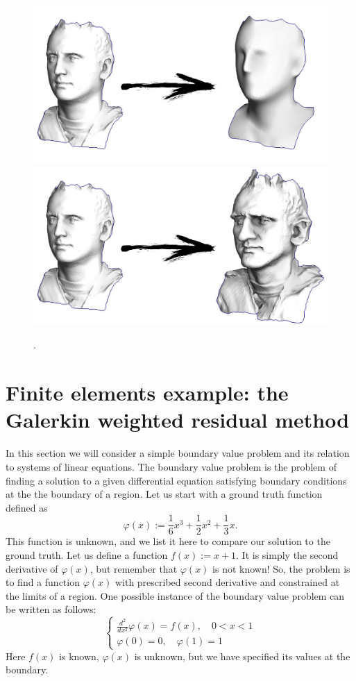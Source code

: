 \documentclass[notitlepage]{report}
\begin{document}
\begin{figure}[ht]
	\centering
	\includegraphics[width=.8\linewidth]{barycenter/ls-teaser2.jpg}
	\includegraphics[width=.8\linewidth]{barycenter/ls-teaser.jpg}
	\caption{.}
	\label{fig:????}
\end{figure}


\chapter{Finite elements example: the Galerkin weighted residual method}

In this section we will consider a simple boundary value problem and its relation to systems of linear equations.
The boundary value problem is the problem of finding a solution to a given differential equation satisfying boundary conditions at the the boundary of a region.
Let us start with a ground truth function defined as 
$$
\varphi(x) := \frac{1}{6} x^3 + \frac{1}{2} x^2 + \frac{1}{3} x.
$$
This function is unknown, and we list it here to compare our solution to the ground truth.
Let us define a function $f(x) := x+1$.
It is simply the second derivative of $\varphi(x)$, but remember that $\varphi(x)$ is not known!
So, the problem is to find a function $\varphi(x)$ with prescribed second derivative and constrained at the limits of a region.
One possible instance of the boundary value problem can be written as follows:
$$
\left\{
\begin{split}
\frac{d^2}{dx^2}\varphi(x) = f(x), \quad 0 < x < 1\\
\varphi(0)=0, \quad \varphi(1)=1
\end{split}
\right.
$$
Here $f(x)$ is known, $\varphi(x)$ is unknown, but we have specified its values at the boundary.
\end{document}
